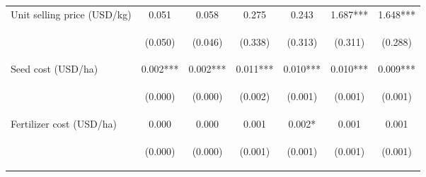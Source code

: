 \begin{center}
\begin{tabular}{lcccccc}
Unit selling price (USD/kg) & 0.051 & 0.058 & 0.275 & 0.243 & 1.687*** & 1.648*** \\
\vspace{4pt} & \begin{footnotesize}(0.050)\end{footnotesize} & \begin{footnotesize}(0.046)\end{footnotesize} & \begin{footnotesize}(0.338)\end{footnotesize} & \begin{footnotesize}(0.313)\end{footnotesize} & \begin{footnotesize}(0.311)\end{footnotesize} & \begin{footnotesize}(0.288)\end{footnotesize} \\
Seed cost (USD/ha) & 0.002*** & 0.002*** & 0.011*** & 0.010*** & 0.010*** & 0.009*** \\
\vspace{4pt} & \begin{footnotesize}(0.000)\end{footnotesize} & \begin{footnotesize}(0.000)\end{footnotesize} & \begin{footnotesize}(0.002)\end{footnotesize} & \begin{footnotesize}(0.001)\end{footnotesize} & \begin{footnotesize}(0.001)\end{footnotesize} & \begin{footnotesize}(0.001)\end{footnotesize} \\
Fertilizer cost (USD/ha) & 0.000 & 0.000 & 0.001 & 0.002* & 0.001 & 0.001 \\
\vspace{4pt} & \begin{footnotesize}(0.000)\end{footnotesize} & \begin{footnotesize}(0.000)\end{footnotesize} & \begin{footnotesize}(0.001)\end{footnotesize} & \begin{footnotesize}(0.001)\end{footnotesize} & \begin{footnotesize}(0.001)\end{footnotesize} & \begin{footnotesize}(0.001)\end{footnotesize} \\

\end{tabular}
\end{center}
